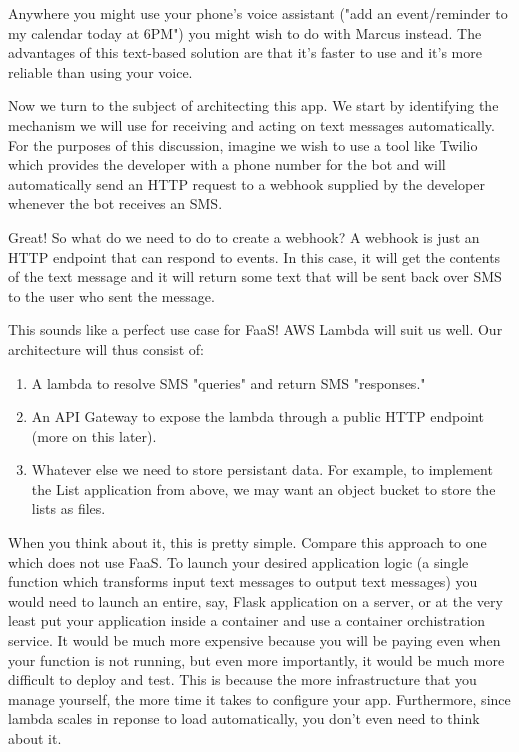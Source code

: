 \documentclass{article}
\begin{document}
Anywhere you might use your phone's voice assistant ("add an event/reminder to my calendar today at 6PM") you might wish to do with Marcus instead.
The advantages of this text-based solution are that it's faster to use and it's more reliable than using your voice.

Now we turn to the subject of architecting this app.
We start by identifying the mechanism we will use for receiving and acting on text messages automatically.
For the purposes of this discussion, imagine we wish to use a tool like Twilio which provides the developer with a phone number for the bot and will automatically send an HTTP request to a webhook supplied by the developer whenever the bot receives an SMS.

Great!
So what do we need to do to create a webhook?
A webhook is just an HTTP endpoint that can respond to events.
In this case, it will get the contents of the text message and it will return some text that will be sent back over SMS to the user who sent the message.

This sounds like a perfect use case for FaaS!
AWS Lambda will suit us well.
Our architecture will thus consist of:

\begin{enumerate}
  \item A lambda to resolve SMS "queries" and return SMS "responses."
  \item An API Gateway to expose the lambda through a public HTTP endpoint (more on this later).
  \item Whatever else we need to store persistant data. For example, to implement the List application from above, we may want an object bucket to store the lists as files.
\end{enumerate}

When you think about it, this is pretty simple.
Compare this approach to one which does not use FaaS.
To launch your desired application logic (a single function which transforms input text messages to output text messages) you would need to launch an entire, say, Flask application on a server, or at the very least put your application inside a container and use a container orchistration service.
It would be much more expensive because you will be paying even when your function is not running, but even more importantly, it would be much more difficult to deploy and test.
This is because the more infrastructure that you manage yourself, the more time it takes to configure your app.
Furthermore, since lambda scales in reponse to load automatically, you don't even need to think about it.
\end{document}
